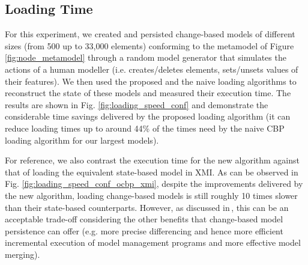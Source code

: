 \documentclass{llncs}
\begin{document}
\subsection{Loading Time}
\label{subsec:loading_time_test}

For this experiment, we created and persisted change-based models of different sizes (from 500 up to 33,000 elements) conforming to the metamodel of Figure \ref{fig:node_metamodel} through a random model generator that simulates the actions of a human modeller (i.e. creates/deletes elements, sets/unsets values of their features). We then used the proposed and the naive loading algorithms to reconstruct the state of these models and measured their execution time. The results are shown in Fig. \ref{fig:loading_speed_conf} and demonstrate the considerable time savings delivered by the proposed loading algorithm (it can reduce loading times up to around 44\% of the times need by the naive CBP loading algorithm for our largest models).

For reference, we also contrast the execution time for the new algorithm against that of loading the equivalent state-based model in XMI. As can be observed in Fig. \ref{fig:loading_speed_conf_ocbp_xmi}, despite the improvements delivered by the new algorithm, loading change-based models is still roughly 10 times slower than their state-based counterparts. However, as discussed in\,\cite{yohannis2017turning}, this can be an acceptable trade-off considering the other benefits that change-based model persistence can offer (e.g. more precise differencing and hence more efficient incremental execution of model management programs and more effective model merging).
\end{document}
